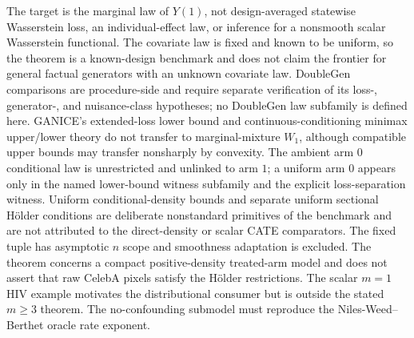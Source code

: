 \documentclass{article}
\begin{document}
The target is the marginal law of \(Y(1)\), not design-averaged statewise Wasserstein loss, an individual-effect law, or inference for a nonsmooth scalar Wasserstein functional. The covariate law is fixed and known to be uniform, so the theorem is a known-design benchmark and does not claim the frontier for general factual generators with an unknown covariate law. DoubleGen comparisons are procedure-side and require separate verification of its loss-, generator-, and nuisance-class hypotheses; no DoubleGen law subfamily is defined here. GANICE's extended-loss lower bound and continuous-conditioning minimax upper/lower theory do not transfer to marginal-mixture \(W_1\), although compatible upper bounds may transfer nonsharply by convexity. The ambient arm \(0\) conditional law is unrestricted and unlinked to arm \(1\); a uniform arm \(0\) appears only in the named lower-bound witness subfamily and the explicit loss-separation witness. Uniform conditional-density bounds and separate uniform sectional Hölder conditions are deliberate nonstandard primitives of the benchmark and are not attributed to the direct-density or scalar CATE comparators. The fixed tuple has asymptotic \(n\) scope and smoothness adaptation is excluded. The theorem concerns a compact positive-density treated-arm model and does not assert that raw CelebA pixels satisfy the Hölder restrictions. The scalar \(m=1\) HIV example motivates the distributional consumer but is outside the stated \(m\ge3\) theorem. The no-confounding submodel must reproduce the Niles-Weed--Berthet oracle rate exponent.
\end{document}
